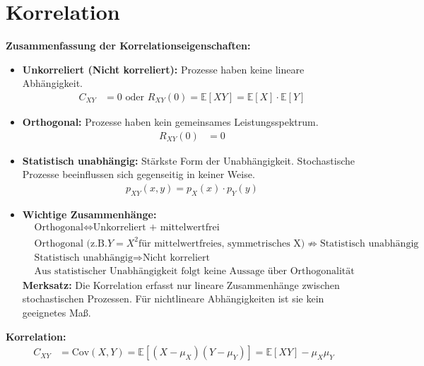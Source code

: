 \section{Korrelation}

\textbf{Zusammenfassung der Korrelationseigenschaften:}

\begin{itemize}
  \item \textbf{Unkorreliert (Nicht korreliert):} 
    Prozesse haben keine lineare Abhängigkeit.
    \begin{align}
      C_{XY} &= 0 \text{ oder } R_{XY}(0) = \mathbb{E}[XY] = \mathbb{E}[X] \cdot \mathbb{E}[Y]
    \end{align}

    
  \item \textbf{Orthogonal:}
    Prozesse haben kein gemeinsames Leistungsspektrum.
    \begin{align}
      R_{XY}(0) &= 0
    \end{align}
    
  \item \textbf{Statistisch unabhängig:} 
    Stärkste Form der Unabhängigkeit. Stochastische Prozesse beeinflussen sich gegenseitig in keiner Weise.
    \begin{align}
      p_{XY}(x,y) = p_X(x) \cdot p_Y(y)
    \end{align}
   
    
  \item \textbf{Wichtige Zusammenhänge:}
    \begin{align}
      &\text{Orthogonal} \Leftrightarrow  \text{Unkorreliert + mittelwertfrei}\\
      &\text{Orthogonal (z.B.} Y=X^2 \text{für mittelwertfreies, symmetrisches X)} \not\Rightarrow \text{Statistisch unabhängig}\\
      &\text{Statistisch unabhängig} \Rightarrow \text{Nicht korreliert}\\
      &\text{Aus statistischer Unabhängigkeit folgt keine Aussage über Orthogonalität}
    \end{align}
    \textbf{Merksatz:} Die Korrelation erfasst nur lineare Zusammenhänge zwischen stochastischen Prozessen. Für nichtlineare Abhängigkeiten ist sie kein geeignetes Maß.
\end{itemize}



\textbf{Korrelation:}
\begin{align}
C_{XY} &= \text{Cov}(X,Y) = \mathbb{E}[(X-\mu_X)(Y-\mu_Y)] = \mathbb{E}[XY] - \mu_X \mu_Y
\end{align}

